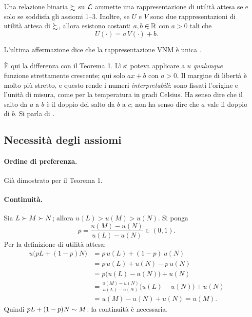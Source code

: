 \begin{teorema}
Una relazione binaria $\succsim$ su $\mathcal{L}$ ammette una rappresentazione di utilità attesa
se e solo se soddisfa gli assiomi 1--3. Inoltre, se $U$ e $V$ sono due rappresentazioni
di utilità attesa di $\succsim$, allora esistono costanti $a, b \in \mathbb{R}$ con $a > 0$ tali che
\[
  U(\cdot) = a\,V(\cdot) + b .
\]
\end{teorema}

L'ultima affermazione dice che la rappresentazione VNM è unica .

\begin{osservazione}
È qui la differenza con il Teorema 1. Lì si poteva applicare a $u$ \emph{qualunque}
funzione strettamente crescente; qui solo $a x + b$ con $a>0$. Il margine di libertà è
molto più stretto, e questo rende i numeri \emph{interpretabili}: sono fissati l'origine
e l'unità di misura, come per la temperatura in gradi Celsius. Ha senso dire che il salto
da $a$ a $b$ è il doppio del salto da $b$ a $c$; non ha senso dire che $a$ vale il doppio
di $b$. Si parla di .
\end{osservazione}

\subsection{Necessità degli assiomi}

\paragraph{Ordine di preferenza.} Già dimostrato per il Teorema 1.

\paragraph{Continuità.}
Sia $L \succ M \succ N$; allora $u(L) > u(M) > u(N)$. Si ponga
\[
  p = \frac{u(M) - u(N)}{u(L) - u(N)} \in (0,1).
\]
Per la definizione di utilità attesa:
\begin{align*}
  u\bigl(pL + (1-p)N\bigr)
    &= p\,u(L) + (1-p)\,u(N)\\
    &= p\,u(L) + u(N) - p\,u(N)\\
    &= p\bigl(u(L) - u(N)\bigr) + u(N)\\
    &= \frac{u(M) - u(N)}{u(L) - u(N)}\bigl(u(L) - u(N)\bigr) + u(N)\\
    &= u(M) - u(N) + u(N) = u(M).
\end{align*}
Quindi $pL + (1-p)N \sim M$: la continuità è necessaria.

